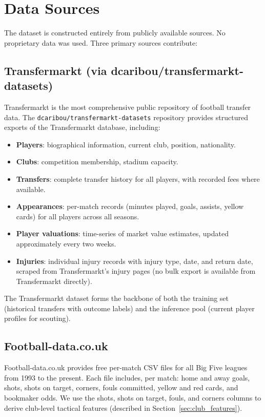 \documentclass[12pt, a4paper, oneside]{report}
\begin{document}
\section{Data Sources}

The dataset is constructed entirely from publicly available sources. No proprietary data was used. Three primary sources contribute:

\subsection{Transfermarkt (via dcaribou/transfermarkt-datasets)}

Transfermarkt is the most comprehensive public repository of football transfer data. The \texttt{dcaribou/transfermarkt-datasets} repository \citep{dcaribou2023} provides structured exports of the Transfermarkt database, including:

\begin{itemize}[leftmargin=2em]
    \item \textbf{Players}: biographical information, current club, position, nationality.
    \item \textbf{Clubs}: competition membership, stadium capacity.
    \item \textbf{Transfers}: complete transfer history for all players, with recorded fees where available.
    \item \textbf{Appearances}: per-match records (minutes played, goals, assists, yellow cards) for all players across all seasons.
    \item \textbf{Player valuations}: time-series of market value estimates, updated approximately every two weeks.
    \item \textbf{Injuries}: individual injury records with injury type, date, and return date, scraped from Transfermarkt's injury pages (no bulk export is available from Transfermarkt directly).
\end{itemize}

The Transfermarkt dataset forms the backbone of both the training set (historical transfers with outcome labels) and the inference pool (current player profiles for scouting).

\subsection{Football-data.co.uk}

Football-data.co.uk \citep{footballdata2023} provides free per-match CSV files for all Big Five leagues from 1993 to the present. Each file includes, per match: home and away goals, shots, shots on target, corners, fouls committed, yellow and red cards, and bookmaker odds. We use the shots, shots on target, fouls, and corners columns to derive club-level tactical features (described in Section~\ref{sec:club_features}).
\end{document}
